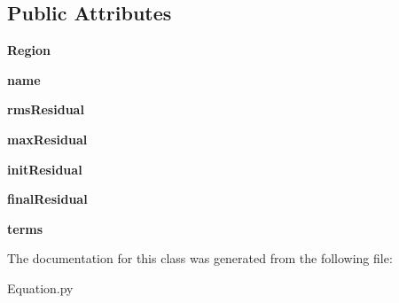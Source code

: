 \subsection*{Public Attributes}
\begin{DoxyCompactItemize}
\item 
\mbox{\label{classpy_f_v_m_1_1_equation_1_1_equation_abb8435e489ac369dd708585da32ac18c}} 
{\bfseries Region}
\item 
\mbox{\label{classpy_f_v_m_1_1_equation_1_1_equation_ac1a959b011772e3b93fe59c512188579}} 
{\bfseries name}
\item 
\mbox{\label{classpy_f_v_m_1_1_equation_1_1_equation_a80ea8a4f9f88e0de22e7264c90effe37}} 
{\bfseries rms\+Residual}
\item 
\mbox{\label{classpy_f_v_m_1_1_equation_1_1_equation_a9bd548f2ece3365f565aa6afa2ddfb9d}} 
{\bfseries max\+Residual}
\item 
\mbox{\label{classpy_f_v_m_1_1_equation_1_1_equation_a704429f1e24f95f4c7cfc22727cb9d16}} 
{\bfseries init\+Residual}
\item 
\mbox{\label{classpy_f_v_m_1_1_equation_1_1_equation_a826845c95d5546b35354c2a0bb52b838}} 
{\bfseries final\+Residual}
\item 
\mbox{\label{classpy_f_v_m_1_1_equation_1_1_equation_a172da1fe25fe04e1379cd304cdd7bd56}} 
{\bfseries terms}
\end{DoxyCompactItemize}


The documentation for this class was generated from the following file\+:\begin{DoxyCompactItemize}
\item 
Equation.\+py\end{DoxyCompactItemize}

